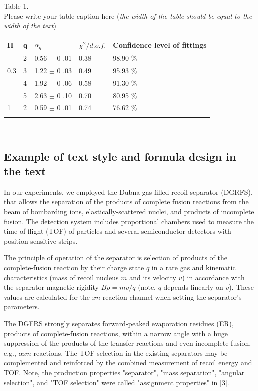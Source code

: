 \documentclass[12pt,a4paper,twoside]{article}
\begin{document}
\begin{flushleft}
Table 1.\\
Please write your table caption here (\textit{the width of the table should be equal to the width of the text})\\
\begin{tabular}{p{1cm}|p{2.8cm}|p{3cm}|p{3cm}|p{3cm}}
\hline\noalign{\smallskip}
H&   q &  $\alpha_q$&   $\chi^{2}/d.o.f.$  & Confidence level of fittings\\ \hline\noalign{\smallskip}
 &2 &0.56 $\pm$  0 .01 & 0.38 & 98.90 \% \\ \cline{2-5}
0.3		&3 &1.22 $\pm$  0 .03 & 0.49 & 95.93 \% \\\cline{2-5}
		&4 &1.92 $\pm$  0 .06 & 0.58 & 91.30 \% \\\cline{2-5}
		&5 &2.63 $\pm$  0 .10 & 0.70 & 80.95 \% \\\hline\noalign{\smallskip}
1 	&2 &0.59 $\pm$  0 .01  &0.74 & 76.62 \% \\ \hline\noalign{\smallskip}
\end{tabular}\\[0.3cm]
\end{flushleft}

\subsection*{Example of text style and formula design in the text}


In our experiments, we employed the Dubna gas-filled recoil separator (DGRFS), that allows the separation of the products of complete fusion reactions from the beam of bombarding ions, elastically-scattered nuclei, and products of incomplete fusion. The detection system includes proportional chambers used to measure the time of flight (TOF) of particles and several semiconductor detectors with position-sensitive strips. 

The principle of operation of the separator is selection of products of the complete-fusion reaction by their charge state $q$ in a rare gas and kinematic characteristics (mass of recoil nucleus $m$ and its velocity $v$) in accordance with the separator magnetic rigidity $B\rho=mv/q$ (note, $q$ depends linearly on $v$). These values are calculated for the $xn$-reaction channel when setting the separator's parameters. 

The DGFRS strongly separates forward-peaked evaporation residues (ER), products of complete-fusion reactions, within a narrow angle with a huge suppression of the products of the transfer reactions and even incomplete fusion, e.g., $\alpha xn$ reactions. The TOF selection in the existing separators may be complemented and reinforced by the combined measurement of recoil energy and TOF. Note, the production properties "separator", "mass separation", "angular selection", and "TOF selection" were called "assignment properties" in [3].
\end{document}
